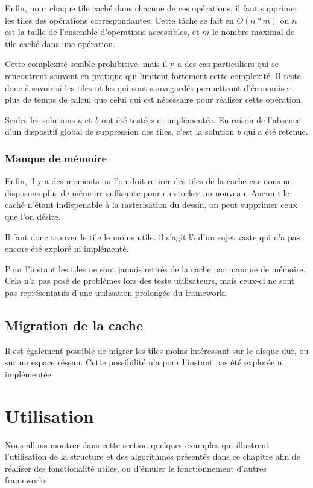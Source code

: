				Enfin, pour chaque tile caché dans chacune de ces opérations, il faut supprimer les tiles des opérations correspondantes.
				Cette tâche se fait en $O(n*m)$ ou $n$ est la taille de l'ensemble d'opérations accessibles, et $m$ le nombre maximal de
				tile caché dans une opération. 

				Cette complexité semble prohibitive, mais il y a des cas particuliers qui se rencontrent souvent en pratique qui limitent
				fortement cette complexité. Il reste donc à savoir si les tiles utiles qui sont sauvegardés permettront 
				d'économiser plus de temps de calcul que celui qui est nécessaire pour réaliser cette opération. 

			Seules les solutions \emph{a} et \emph{b} ont été testées et implémentée. En raison de l'absence d'un dispositif global de suppression
			des tiles, c'est la solution \emph{b} qui a été retenue. 

			\subsubsection{Manque de mémoire}
			Enfin, il y a des moments ou l'on doit retirer des tiles de la cache car nous ne disposons plus de mémoire suffisante
			pour en stocker un nouveau. Aucun tile caché n'étant indispenable à la rasterisation du dessin, on peut supprimer ceux que l'on désire.
			
			Il faut donc trouver le tile le moins utile. il s'agit là d'un sujet vaste qui n'a pas encore été exploré
			ni implémenté. 
			
			Pour l'instant les tiles ne sont jamais retirés de la cache par manque de mémoire. Cela n'a pas posé de problèmes lors
			des tests utilisateurs, mais ceux-ci ne sont pas représentatifs d'une utilisation prolongée du framework. 

		\subsection{Migration de la cache}
			Il est également possible de migrer les tiles moins intéressant sur le disque dur, ou sur un espace réseau.
			Cette possibilité n'a pour l'instant pas été explorée ni implémentée.

	\section{Utilisation}
		Nous allons montrer dans cette section quelques examples qui illustrent l'utilisation de la structure et des algorithmes présentés
		dans ce chapitre afin de réaliser des fonctionalité utiles, ou d'émuler le fonctionnement d'autres frameworks. 
